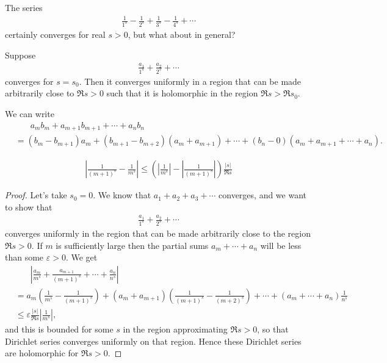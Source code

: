 \documentclass[11pt, oneside,margin=1in]{article}
\begin{document}
The series
\begin{align*}
	\frac{1}{1^s} - \frac{1}{2^s} + \frac{1}{3^s} -\frac{1}{4^s}+\cdots
\end{align*}
certainly converges for real $s>0$, but what about in general?

\begin{proposition}[ ]\label{}\text{}
Suppose \begin{align*}
	\frac{a_1}{1^s} + \frac{a_2}{2^s} + \cdots
\end{align*}
converges for $s=s_0$. Then it converges uniformly in a region that can be made arbitrarily close to $\Re s>0$ such that it is holomorphic in the region $\Re s>\Re s_0$.
\end{proposition}
\begin{remark}
	 We can write
	\begin{align*}
	&\phantom{=}\ \	a_mb_m+ a_{m+1} b_{m+1} + \cdots+a_nb_n\\ &= (b_m - b_{m+1}) a_m +  (b_{m+1} - b_{m+2}) (a_m + a_{m+1}) + \cdots +  (b_n - 0) (a_m + a_{m+1} + \cdots + a_n).
	\end{align*}
\end{remark}
\begin{remark}
	\begin{align*}
		\left\lvert \frac{1}{(m+1) ^s} - \frac{1}{m^s} \right\rvert \le \left(\left\lvert \frac{1}{m^s}  \right\rvert - \left\lvert \frac{1}{(m+1)^s} \right\rvert \right) \frac{\left\lvert s \right\rvert }{\Re s}
	\end{align*}
\end{remark}
\begin{proof}
Let's take $s_0=0$. We know that $a_1+a_2+a_3+\cdots$ converges, and we want to show that \begin{align*}
	\frac{a_1}{1^s} + \frac{a_2}{2^s} + \cdots
\end{align*}
converges uniformly in the region that can be made arbitrarily close to the region $\Re s > 0$. If $m$ is sufficiently large then the partial sums $a_m +\cdots +a_n$ will be less than some $\varepsilon > 0$. We get 
\begin{align*}
	&\phantom{=}\ \ \left\lvert \frac{a_m}{m^s} + \frac{a_{m+1}}{(m+1)^s} + \cdots + \frac{a_n}{n^s} \right\rvert \\
	&= a_m \left( \frac{1}{m^s} - \frac{1}{(m+1)^s} \right) + (a_m + a_{m+1}) \left( \frac{1}{(m+1)^s} -  \frac{1}{(m+2)^s} \right) + \cdots + (a_m + \cdots + a_n)  \frac{1}{n^s}\\
	&\le \varepsilon \frac{\left\lvert s \right\rvert }{\Re s} \left\lvert \frac{1}{m^s} \right\rvert, 
\end{align*}
and this is bounded for some $s$ in the region approximating $\Re s> 0 $, so that Dirichlet series converges uniformly on that region. Hence these Dirichlet series are holomorphic for $\Re s > 0$.
\end{proof}
\end{document}
